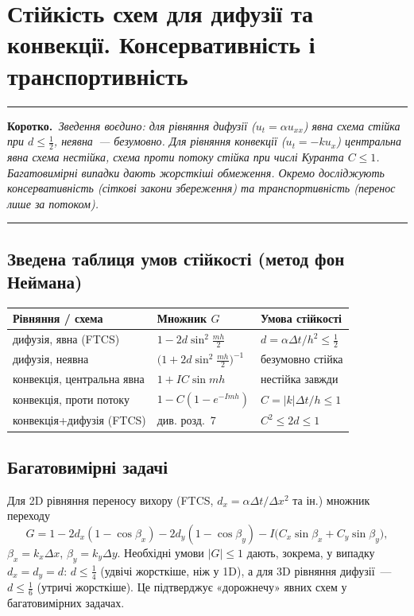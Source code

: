 \documentclass[12pt,a4paper]{article}
\theoremstyle{definition}
\theoremstyle{plain}
\newenvironment{korotko}
  {\par\medskip\noindent\begingroup\color{accent!75!black}\rule{\linewidth}{0.4pt}\par
   \noindent\textbf{Коротко.}\itshape\,}
  {\par\noindent\rule{\linewidth}{0.4pt}\endgroup\medskip}
\newcommand{\abs}[1]{\left\lvert #1 \right\rvert}
\begin{document}
\newpage
\section{Стійкість схем для дифузії та конвекції. Консервативність і транспортивність}

\begin{korotko}
Зведення воєдино: для рівняння \emph{дифузії} ($u_t=\alpha u_{xx}$) явна
схема стійка при $d\le\tfrac12$, неявна~--- безумовно. Для рівняння
\emph{конвекції} ($u_t=-ku_x$) центральна явна схема нестійка, схема
проти потоку стійка при числі Куранта $C\le1$. Багатовимірні випадки
дають жорсткіші обмеження. Окремо досліджують \emph{консервативність}
(сіткові закони збереження) та \emph{транспортивність} (перенос лише за
потоком).
\end{korotko}

\subsection{Зведена таблиця умов стійкості (метод фон Неймана)}
\begin{center}
\renewcommand{\arraystretch}{1.35}
\begin{tabular}{@{}p{5.2cm}p{4.4cm}p{4.6cm}@{}}
\toprule
\textbf{Рівняння / схема} & \textbf{Множник $G$} & \textbf{Умова стійкості}\\
\midrule
дифузія, явна (FTCS) & $1-2d\sin^2\tfrac{mh}{2}$ & $d=\alpha\Delta t/h^2\le\tfrac12$\\
дифузія, неявна & $\big(1+2d\sin^2\tfrac{mh}{2}\big)^{-1}$ & безумовно стійка\\
конвекція, центральна явна & $1+IC\sin mh$ & нестійка завжди\\
конвекція, проти потоку & $1-C(1-e^{-Imh})$ & $C=\abs{k}\Delta t/h\le1$\\
конвекція+дифузія (FTCS) & див. розд.~7 & $C^2\le2d\le1$\\
\bottomrule
\end{tabular}
\end{center}

\subsection{Багатовимірні задачі}
Для 2D рівняння переносу вихору (FTCS, $d_x=\alpha\Delta t/\Delta x^2$ та
ін.) множник переходу
\[
  G=1-2d_x(1-\cos\beta_x)-2d_y(1-\cos\beta_y)-I\big(C_x\sin\beta_x+C_y\sin\beta_y\big),
\]
$\beta_x=k_x\Delta x$, $\beta_y=k_y\Delta y$. Необхідні умови $\abs{G}\le1$
дають, зокрема, у випадку $d_x=d_y=d$:\; $d\le\tfrac14$ (удвічі жорсткіше,
ніж у 1D), а для 3D рівняння дифузії~--- $d\le\tfrac16$ (утричі жорсткіше).
Це підтверджує «дорожнечу» явних схем у багатовимірних задачах.
\end{document}
